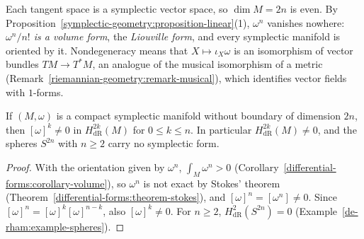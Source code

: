 Each tangent space is a symplectic vector space, so $\dim M = 2n$ is even. By Proposition~\ref{symplectic-geometry:proposition-linear}(1), $\omega^n$ vanishes nowhere: \emph{$\omega^n/n!$ is a volume
form}, the \emph{Liouville form}, and every symplectic manifold is oriented by it. Nondegeneracy means that $X \mapsto \iota_X\omega$ is an isomorphism of vector bundles $TM \to T^*M$, an analogue of the
musical isomorphism of a metric (Remark~\ref{riemannian-geometry:remark-musical}), which identifies vector fields with $1$-forms.

\begin{proposition}\label{symplectic-geometry:proposition-cohomology}
If $(M, \omega)$ is a compact symplectic manifold without boundary of dimension $2n$, then $[\omega]^k \neq 0$ in $H^{2k}_{\mathrm{dR}}(M)$ for $0 \leq k \leq n$. In particular $H^{2k}_{\mathrm{dR}}(M) \neq 0$, and
the spheres $S^{2n}$ with $n \geq 2$ carry no symplectic form.
\end{proposition}

\begin{proof}
With the orientation given by $\omega^n$, $\int_M\omega^n > 0$ (Corollary~\ref{differential-forms:corollary-volume}), so $\omega^n$ is not exact by Stokes' theorem
(Theorem~\ref{differential-forms:theorem-stokes}), and $[\omega]^n = [\omega^n] \neq 0$. Since $[\omega]^n = [\omega]^k[\omega]^{n-k}$, also $[\omega]^k \neq 0$. For $n \geq 2$, $H^2_{\mathrm{dR}}(S^{2n}) = 0$
(Example~\ref{de-rham:example-spheres}).
\end{proof}

